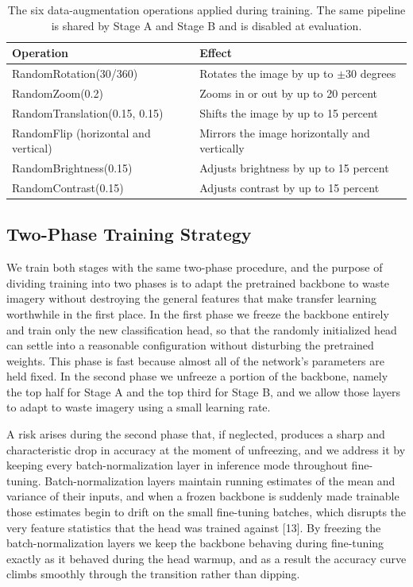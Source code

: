 \documentclass[10pt,twocolumn]{article}
\begin{document}
\begin{table}[t]
\centering
\footnotesize
\begin{tabular}{@{}p{}p{}@{}}
\toprule
\textbf{Operation} & \textbf{Effect} \\
\midrule
RandomRotation(30/360) & Rotates the image by up to $\pm30$ degrees \\
RandomZoom(0.2) & Zooms in or out by up to 20 percent \\
RandomTranslation(0.15, 0.15) & Shifts the image by up to 15 percent \\
RandomFlip (horizontal and vertical) & Mirrors the image horizontally and vertically \\
RandomBrightness(0.15) & Adjusts brightness by up to 15 percent \\
RandomContrast(0.15) & Adjusts contrast by up to 15 percent \\
\bottomrule
\end{tabular}
\caption{The six data-augmentation operations applied during training. The same pipeline is shared by Stage A and Stage B and is disabled at evaluation.}
\label{tab:aug}
\end{table}

\subsection{Two-Phase Training Strategy}
We train both stages with the same two-phase procedure, and the purpose of dividing training into two phases is to adapt the pretrained backbone to waste imagery without destroying the general features that make transfer learning worthwhile in the first place. In the first phase we freeze the backbone entirely and train only the new classification head, so that the randomly initialized head can settle into a reasonable configuration without disturbing the pretrained weights. This phase is fast because almost all of the network's parameters are held fixed. In the second phase we unfreeze a portion of the backbone, namely the top half for Stage A and the top third for Stage B, and we allow those layers to adapt to waste imagery using a small learning rate.

A risk arises during the second phase that, if neglected, produces a sharp and characteristic drop in accuracy at the moment of unfreezing, and we address it by keeping every batch-normalization layer in inference mode throughout fine-tuning. Batch-normalization layers maintain running estimates of the mean and variance of their inputs, and when a frozen backbone is suddenly made trainable those estimates begin to drift on the small fine-tuning batches, which disrupts the very feature statistics that the head was trained against [13]. By freezing the batch-normalization layers we keep the backbone behaving during fine-tuning exactly as it behaved during the head warmup, and as a result the accuracy curve climbs smoothly through the transition rather than dipping.
\end{document}
